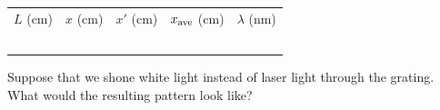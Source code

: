 \begin{enumerate}
{\renewcommand{\arraystretch}{2.0}
{\centering \begin{tabular}{|C{0.8in}|C{0.8in}|C{0.8in}|C{0.8in}|C{0.8in}|}
\hline 
$L$ (cm) & $x$ (cm) & $x'$ (cm) & $x_{\rm ave}$ (cm) & $\lambda$ (nm) \\
\hhline{|=|=|=|=|=|}
& & & & \\ \hline
& & & & \\ \hline
& & & & \\ \hline
& & & & \\ \hline
& & & & \\ \hline
\end{tabular}\par}}
 
\end{enumerate}

\bigskip

Suppose that we shone white light instead of laser light
through the grating.  What would the resulting pattern look
like?

